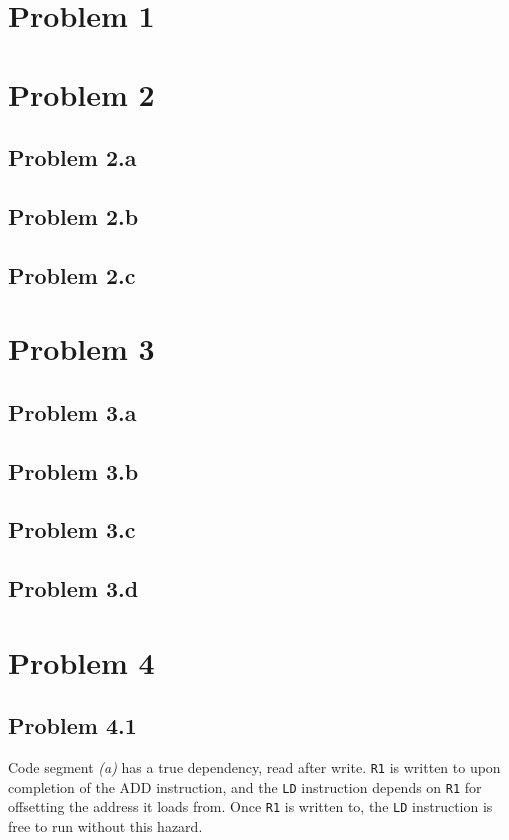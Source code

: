 \documentclass[12pt,letterpaper]{article}
\begin{document}
\section*{Problem 1}


\section*{Problem 2}

\subsection*{Problem 2.a}
\subsection*{Problem 2.b}
\subsection*{Problem 2.c}

\section*{Problem 3}

\subsection*{Problem 3.a}
\subsection*{Problem 3.b}
\subsection*{Problem 3.c}
\subsection*{Problem 3.d}


\section*{Problem 4}



\subsection*{Problem 4.1}

Code segment \textit{(a)} has a true dependency, read after write. \lstinline{R1} is written to upon completion of the
ADD instruction, and the \lstinline{LD} instruction depends on \lstinline{R1} for offsetting the address it loads from.
Once \lstinline{R1} is written to, the \lstinline{LD} instruction is free to run without this hazard.
\end{document}
